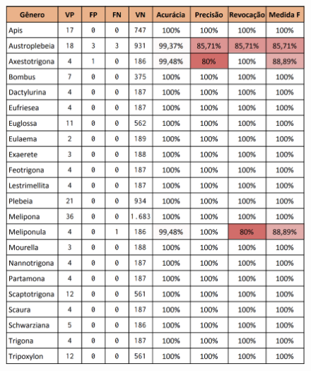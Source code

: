 \documentclass[
	12pt,				%
	oneside,			%
	a4paper,			%
	english,			%
	brazil				%
	]{abntex2ppgsi}
\begin{document}
\begin{apendicesenv}
\begin{figure}[ht]
    \centering
    \includegraphics[width=1.0\textwidth]{imagens/apendice/final_model_metrics_by_gender.png}
\end{figure}

\end{apendicesenv}



\end{document}
